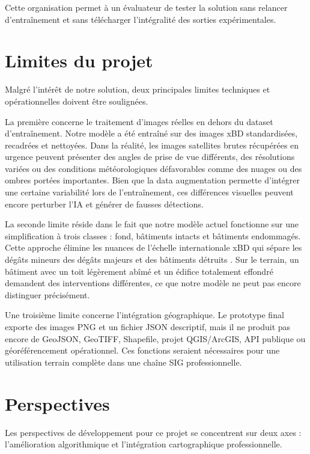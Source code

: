 \documentclass[french,12pt]{article}
\begin{document}
Cette organisation permet à un évaluateur de tester la solution sans relancer d'entraînement et sans télécharger l'intégralité des sorties expérimentales.

\section{Limites du projet}

Malgré l'intérêt de notre solution, deux principales limites techniques et opérationnelles doivent être soulignées.

La première concerne le traitement d'images réelles en dehors du dataset d'entraînement. Notre modèle a été entraîné sur des images xBD standardisées, recadrées et nettoyées. Dans la réalité, les images satellites brutes récupérées en urgence peuvent présenter des angles de prise de vue différents, des résolutions variées ou des conditions météorologiques défavorables comme des nuages ou des ombres portées importantes. Bien que la data augmentation permette d'intégrer une certaine variabilité lors de l'entraînement, ces différences visuelles peuvent encore perturber l'IA et générer de fausses détections.

La seconde limite réside dans le fait que notre modèle actuel fonctionne sur une simplification à trois classes : fond, bâtiments intacts et bâtiments endommagés. Cette approche élimine les nuances de l'échelle internationale xBD qui sépare les dégâts mineurs des dégâts majeurs et des bâtiments détruits \cite{xbd}. Sur le terrain, un bâtiment avec un toit légèrement abîmé et un édifice totalement effondré demandent des interventions différentes, ce que notre modèle ne peut pas encore distinguer précisément.

Une troisième limite concerne l'intégration géographique. Le prototype final exporte des images PNG et un fichier JSON descriptif, mais il ne produit pas encore de GeoJSON, GeoTIFF, Shapefile, projet QGIS/ArcGIS, API publique ou géoréférencement opérationnel. Ces fonctions seraient nécessaires pour une utilisation terrain complète dans une chaîne SIG professionnelle.

\section{Perspectives}

Les perspectives de développement pour ce projet se concentrent sur deux axes : l'amélioration algorithmique et l'intégration cartographique professionnelle.
\end{document}

